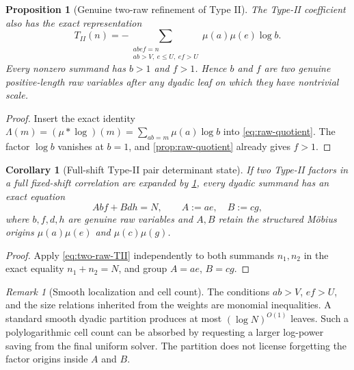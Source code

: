 \documentclass[11pt]{article}
\newtheorem{proposition}[theorem]{Proposition}
\newtheorem{corollary}[theorem]{Corollary}
\theoremstyle{definition}
\theoremstyle{remark}
\newtheorem{remark}[theorem]{Remark}
\newcommand{\1}{\mathbf 1}
\begin{document}
\begin{proposition}[Genuine two-raw refinement of Type II]\label{prop:two-raw-TII}
The Type-II coefficient also has the exact representation
\begin{equation}\label{eq:two-raw-TII}
 \boxed{
 T_{II}(n)
 =-
 \sum_{\substack{a b e f=n\\ab>V,\ e\le U,\ ef>U}}
 \mu(a)\mu(e)\log b.}
\end{equation}
Every nonzero summand has \(b>1\) and \(f>1\).  Hence \(b\) and \(f\) are two genuine positive-length raw variables after any dyadic leaf on which they have nontrivial scale.
\end{proposition}

\begin{proof}
Insert the exact identity \(\Lambda(m)=(\mu*\log)(m)=\sum_{ab=m}\mu(a)\log b\) into \eqref{eq:raw-quotient}.  The factor \(\log b\) vanishes at \(b=1\), and \cref{prop:raw-quotient} already gives \(f>1\).
\end{proof}

\begin{corollary}[Full-shift Type-II pair determinant state]\label{cor:TT-state}
If two Type-II factors in a \emph{full fixed-shift correlation} are expanded by \cref{prop:two-raw-TII}, every dyadic summand has an exact equation
\begin{equation}\label{eq:TT-MRDET}
 A b f+B d h=N,
 \qquad
 A:=ae,\quad B:=cg,
\end{equation}
where \(b,f,d,h\) are genuine raw variables and \(A,B\) retain the structured M\"obius origins \(\mu(a)\mu(e)\) and \(\mu(c)\mu(g)\).
\end{corollary}

\begin{proof}
Apply \eqref{eq:two-raw-TII} independently to both summands \(n_1,n_2\) in the exact equality \(n_1+n_2=N\), and group \(A=ae\), \(B=cg\).
\end{proof}

\begin{remark}[Smooth localization and cell count]\label{rem:cells}
The conditions \(ab>V\), \(ef>U\), and the size relations inherited from the weights are monomial inequalities.  A standard smooth dyadic partition produces at most \((\log N)^{O(1)}\) leaves.  Such a polylogarithmic cell count can be absorbed by requesting a larger log-power saving from the final uniform solver.  The partition does not license forgetting the factor origins inside \(A\) and \(B\).
\end{remark}
\end{document}
